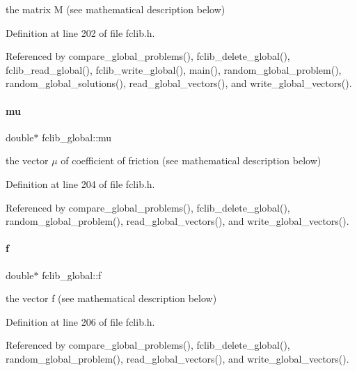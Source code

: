 the matrix M (see mathematical description below) 



Definition at line 202 of file fclib.\+h.



Referenced by compare\+\_\+global\+\_\+problems(), fclib\+\_\+delete\+\_\+global(), fclib\+\_\+read\+\_\+global(), fclib\+\_\+write\+\_\+global(), main(), random\+\_\+global\+\_\+problem(), random\+\_\+global\+\_\+solutions(), read\+\_\+global\+\_\+vectors(), and write\+\_\+global\+\_\+vectors().

\mbox{\label{structfclib__global_a99fd8c775c35a6a0e233df1f8cae181a}} 
\paragraph{\texorpdfstring{mu}{mu}}
{\footnotesize\ttfamily double$\ast$ fclib\+\_\+global\+::mu}



the vector $\mu$ of coefficient of friction (see mathematical description below) 



Definition at line 204 of file fclib.\+h.



Referenced by compare\+\_\+global\+\_\+problems(), fclib\+\_\+delete\+\_\+global(), random\+\_\+global\+\_\+problem(), read\+\_\+global\+\_\+vectors(), and write\+\_\+global\+\_\+vectors().

\mbox{\label{structfclib__global_a6d5d0d1f9169b886eb3d3aca0632e8a9}} 
\paragraph{\texorpdfstring{f}{f}}
{\footnotesize\ttfamily double$\ast$ fclib\+\_\+global\+::f}



the vector f (see mathematical description below) 



Definition at line 206 of file fclib.\+h.



Referenced by compare\+\_\+global\+\_\+problems(), fclib\+\_\+delete\+\_\+global(), random\+\_\+global\+\_\+problem(), read\+\_\+global\+\_\+vectors(), and write\+\_\+global\+\_\+vectors().

